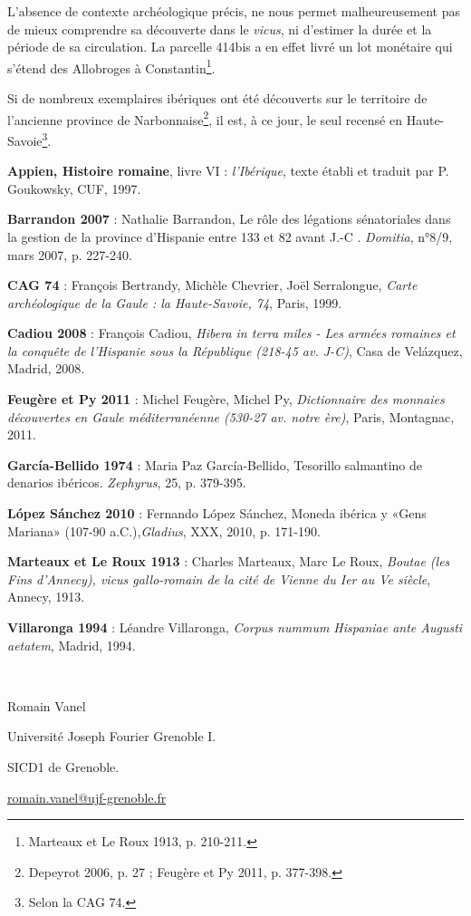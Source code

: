 \documentclass[a4paper,11pt]{article}
\begin{document}
L’absence de contexte archéologique précis, ne nous permet malheureusement
pas de mieux comprendre sa découverte dans le \emph{vicus}, ni d’estimer la durée
et la période de sa circulation. La parcelle 414bis a en effet livré un lot
monétaire qui s’étend des Allobroges à Constantin\footnote{Marteaux et Le Roux 1913, p. 210-211.}.

Si de nombreux exemplaires ibériques ont été découverts sur le territoire
de l’ancienne province de Narbonnaise\footnote{Depeyrot 2006, p. 27 ; Feugère et Py 2011, p. 377-398.}, il est, à ce jour, le seul recensé en
Haute-Savoie\footnote{Selon la CAG 74.}.



\begin{thebibliography}{9}

\textbf{Appien, Histoire romaine}, livre VI : \textit{l’Ibérique}, texte établi et traduit par
P. Goukowsky, CUF, 1997.

\textbf{Barrandon 2007} : Nathalie Barrandon, Le rôle des légations sénatoriales
dans la gestion de la province d’Hispanie entre 133 et 82 avant J.-C . \emph{Domitia},
n°8/9, mars 2007, p. 227-240.

\textbf{CAG 74} : François Bertrandy, Michèle Chevrier, Joël Serralongue, \emph{Carte
archéologique de la Gaule : la Haute-Savoie, 74}, Paris, 1999.

\textbf{Cadiou 2008} : François Cadiou,\emph{ Hibera in terra miles - Les armées romaines
et la conquête de l’Hispanie sous la République (218-45 av. J-C)}, Casa de
Velázquez, Madrid, 2008.

\textbf{Feugère et Py 2011} : Michel Feugère, Michel Py, \emph{Dictionnaire des monnaies
découvertes en Gaule méditerranéenne (530-27 av. notre ère)}, Paris,
Montagnac, 2011.

\textbf{García-Bellido 1974} : Maria Paz García-Bellido, Tesorillo salmantino de
denarios ibéricos. \emph{Zephyrus}, 25, p. 379-395.

\textbf{López Sánchez 2010} : Fernando López Sánchez, Moneda ibérica y «Gens
Mariana» (107-90 a.C.),\emph{Gladius}, XXX, 2010, p. 171-190.

\textbf{Marteaux et Le Roux 1913} : Charles Marteaux, Marc Le Roux, \emph{\emph{Boutae} (les
Fins d’Annecy), vicus gallo-romain de la cité de Vienne du Ier au Ve siècle},
Annecy, 1913.

\textbf{Villaronga 1994	} : Léandre Villaronga, \emph{Corpus nummum Hispaniae ante
Augusti aetatem}, Madrid, 1994.

\end{thebibliography}

~

Romain Vanel

Université Joseph Fourier Grenoble I.

SICD1 de Grenoble.

\url{romain.vanel@ujf-grenoble.fr}
\end{document}
